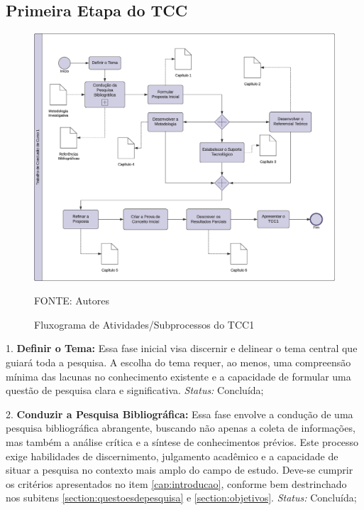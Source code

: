 \subsection{Primeira Etapa do TCC}

\begin{figure}[h]
	\centering
    \caption{Fluxograma de Atividades/Subprocessos do TCC1}
	\includegraphics[keepaspectratio=true,scale=0.4]{figuras/fluxograma_atividades_tcc1.eps}
	\parbox{\linewidth}{\centering FONTE: Autores}
	\label{fluxograma_atividades_tcc1}
\end{figure}

1. \textbf{Definir o Tema:} Essa fase inicial visa discernir e delinear o tema central que guiará toda a pesquisa. A escolha do tema requer, ao menos,
uma compreensão mínima das lacunas no conhecimento existente e a capacidade de formular uma questão de pesquisa clara e significativa.
\textit{Status:} Concluída;

2. \textbf{Conduzir a Pesquisa Bibliográfica:} Essa fase envolve a condução de uma pesquisa bibliográfica abrangente, buscando não apenas a coleta de 
informações, mas também a análise crítica e a síntese de conhecimentos prévios. Este processo exige habilidades de discernimento, julgamento acadêmico e 
a capacidade de situar a pesquisa no contexto mais amplo do campo de estudo. Deve-se cumprir os critérios apresentados no item \ref{cap:introducao}, 
conforme bem destrinchado nos subitens \ref{section:questoesdepesquisa} e \ref{section:objetivos}.
\textit{Status:} Concluída;

